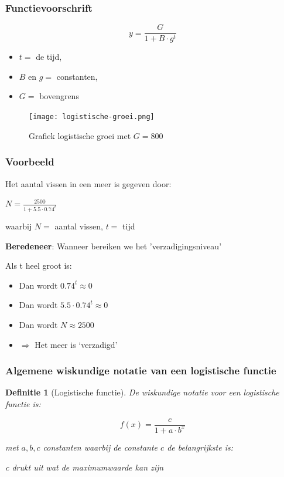 \documentclass{article}
\newtheorem{theorem}{Definitie}[section]
\begin{document}
\subsubsection{Functievoorschrift}

\begin{equation}
y = \frac{G}{1 + B\cdot g^t}
\end{equation}

\begin{itemize}
    \item $t =$ de tijd,
    \item $B$ en $g =$ constanten,
    \item $G =$ bovengrens
\end{itemize}

\begin{figure}[H]
    \centering
    \texttt{[image: logistische-groei.png]}
    \caption{Grafiek logistische groei met $G = 800$}
\end{figure}

\subsubsection{Voorbeeld}

Het aantal vissen in een meer is gegeven door:

\begin{center}
    $N = \frac{2500}{1 + 5.5 \cdot 0.74^t}$
\end{center}

waarbij $N =$ aantal vissen, $t =$ tijd

\textbf{Beredeneer}: Wanneer bereiken we het 'verzadigingsniveau'

Als t heel groot is:

\begin{itemize}
    \item Dan wordt $0.74^t \approx 0$
    \item Dan wordt $5.5 \cdot 0.74^t \approx 0$
    \item Dan wordt $N \approx 2500$
    \item $\Rightarrow$ Het meer is `verzadigd'
\end{itemize}

\subsubsection{Algemene wiskundige notatie van een logistische functie}

\begin{theorem}[Logistische functie]
De wiskundige notatie voor een logistische functie is:

\begin{equation}
    f(x) = \frac{c}{1 + a\cdot b^x}
\end{equation}

met $a,b,c$ constanten waarbij de constante $c$ de belangrijkste is:

c drukt uit wat de maximumwaarde kan zijn
\end{theorem}
\end{document}
